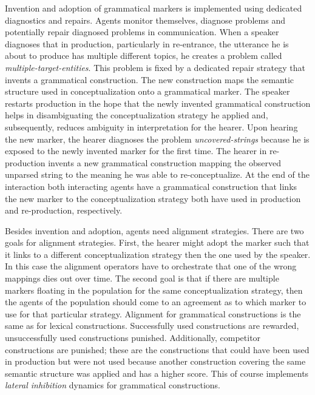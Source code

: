 Invention and adoption of grammatical markers is implemented 
using dedicated diagnostics and repairs. Agents monitor themselves, 
diagnose problems and potentially repair 
diagnosed problems in communication.
When a speaker diagnoses that in production, particularly in re-entrance, 
the utterance he is about to produce has multiple different topics, he 
creates a problem called \emph{multiple-target-entities}. 
This problem is fixed by a dedicated repair strategy that invents 
a grammatical construction. The new construction maps the semantic 
structure used in conceptualization onto a grammatical marker.
The speaker restarts production in the hope that the newly invented 
grammatical construction helps in disambiguating the conceptualization 
strategy he applied and, subsequently, reduces ambiguity in interpretation 
for the hearer. 
Upon hearing
the new marker, the hearer diagnoses the problem \emph{uncovered-strings} 
because he is exposed to the newly invented marker for the first time. The hearer 
in re-production invents a new grammatical construction mapping the 
observed unparsed string to the meaning he was able to re-conceptualize. 
At the end of the interaction both interacting agents have a grammatical 
construction that links the new marker to the conceptualization strategy both 
have used in production and re-production, respectively.

Besides invention and adoption, agents need alignment strategies. 
There are two goals for alignment strategies. First, the hearer might adopt 
the marker such that it links to a different conceptualization strategy then the 
one used by the speaker. In this case the alignment operators
have to orchestrate that one of the wrong mappings dies out over time. The 
second goal is that if there are multiple markers floating in the population 
for the same conceptualization strategy, then the agents of the population 
should come to an agreement as to which marker to use
for that particular strategy. Alignment for grammatical constructions is the same 
as for lexical constructions. Successfully used constructions are rewarded, unsuccessfully used constructions punished. Additionally, competitor 
constructions are punished; these are the constructions that could have 
been used in production but were not used because another construction 
covering the same semantic structure was applied and has a higher score. 
This of course implements \emph{lateral inhibition} dynamics for grammatical constructions. 


